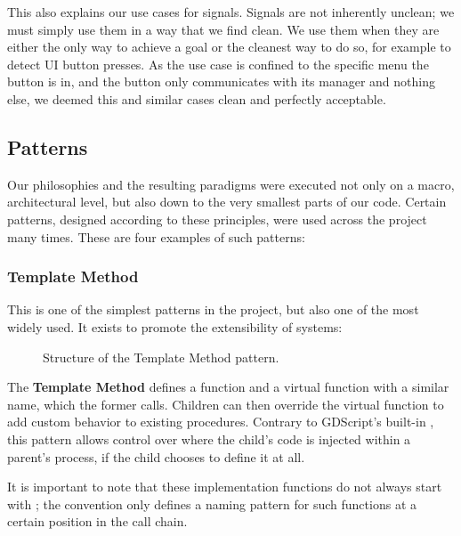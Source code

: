 \documentclass[../Main.tex]{subfiles}
\begin{document}
This also explains our use cases for signals. Signals are not inherently unclean; we must simply use them in a way that we find clean. We use them when they are either the only way to achieve a goal or the cleanest way to do so, for example to detect UI button presses. As the use case is confined to the specific menu the button is in, and the button only communicates with its manager and nothing else, we deemed this and similar cases clean and perfectly acceptable.

\subsection{Patterns}\label{sec:patterns}

Our philosophies and the resulting paradigms were executed not only on a macro, architectural level, but also down to the very smallest parts of our code. Certain patterns, designed according to these principles, were used across the project many times. These are four examples of such patterns:

\subsubsection{Template Method}\label{sec:template-method}

This is one of the simplest patterns in the project, but also one of the most widely used. It exists to promote the extensibility of systems:

\begin{figure}[H]
    \centering
    
    \caption[Structure of the Template Method pattern. Own figure.]{Structure of the Template Method pattern.}
    \label{fig:template-method}
\end{figure}

The \textbf{Template Method}\autocite[325]{gamma1994designpatterns} defines a function and a virtual function with a similar name, which the former calls. Children can then override the virtual function to add custom behavior to existing procedures. Contrary to GDScript's built-in , this pattern allows control over where the child's code is injected within a parent's process, if the child chooses to define it at all.

It is important to note that these implementation functions do not always start with ; the convention only defines a naming pattern for such functions at a certain position in the call chain.
\end{document}
